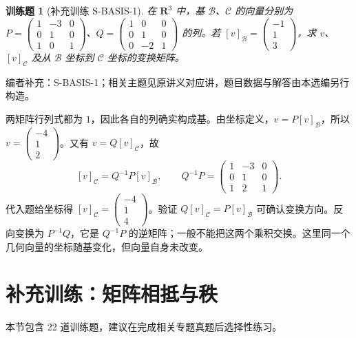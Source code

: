 \documentclass[12pt,fontset=fandol]{ctexart}
\newtheorem{exercise}{训练题}[section]
\begin{document}
\begin{exercise}[补充训练 S-BASIS-1]\label{prob:S-BASIS-1}
在 $\mathbf R^3$ 中，基 $\mathcal B$、$\mathcal C$ 的向量分别为 $P=\begin{pmatrix}1&-3&0\\0&1&0\\1&0&1\end{pmatrix}$、$Q=\begin{pmatrix}1&0&0\\0&1&0\\0&-2&1\end{pmatrix}$ 的列。若 $[v]_{\mathcal B}=\begin{pmatrix}-1\\1\\3\end{pmatrix}$，求 $v$、$[v]_{\mathcal C}$ 及从 $\mathcal B$ 坐标到 $\mathcal C$ 坐标的变换矩阵。
\end{exercise}
\noindent 编者补充：S-BASIS-1；相关主题见原讲义对应讲，题目数据与解答由本选编另行构造。
\begin{solve}
两矩阵行列式都为 $1$，因此各自的列确实构成基。由坐标定义，$v=P[v]_{\mathcal B}$，所以 $v=\begin{pmatrix}-4\\1\\2\end{pmatrix}$。又有 $v=Q[v]_{\mathcal C}$，故
\[[v]_{\mathcal C}=Q^{-1}P[v]_{\mathcal B},\qquad Q^{-1}P=\begin{pmatrix}1&-3&0\\0&1&0\\1&2&1\end{pmatrix}.\]
代入题给坐标得 $[v]_{\mathcal C}=\begin{pmatrix}-4\\1\\4\end{pmatrix}$。验证 $Q[v]_{\mathcal C}=P[v]_{\mathcal B}$ 可确认变换方向。反向变换为 $P^{-1}Q$，它是 $Q^{-1}P$ 的逆矩阵；一般不能把这两个乘积交换。这里同一个几何向量的坐标随基变化，但向量自身未改变。
\end{solve}

\section{补充训练：矩阵相抵与秩}

本节包含 22 道训练题，建议在完成相关专题真题后选择性练习。
\end{document}
